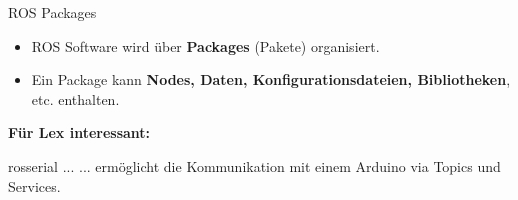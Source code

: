 \documentclass{beamer}
\begin{document}
\begin{frame}{ROS Packages}
\begin{itemize}
	\item ROS Software wird \"uber \textbf{Packages} (Pakete) organisiert.
\end{itemize}
\begin{itemize}
	\item Ein Package kann \textbf{Nodes, Daten, Konfigurationsdateien, Bibliotheken}, etc. enthalten.
\end{itemize}
\vspace{10px}
\begin{large}\textbf{F\"ur Lex interessant:}\end{large}
\vspace{10px}
\begin{alertblock}{rosserial ...}
... erm\"oglicht die Kommunikation mit einem Arduino via Topics und Services.
\end{alertblock}
\end{frame}
\end{document}
